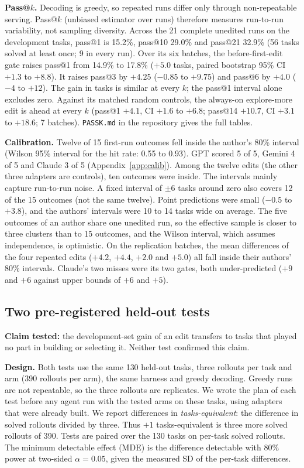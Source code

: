 \textbf{Pass@$k$.} Decoding is greedy, so repeated runs differ only through non-repeatable serving. Pass@$k$ (unbiased estimator over runs) therefore measures run-to-run variability, not sampling diversity. Across the 21 complete unedited runs on the development tasks, pass@1 is 15.2\%, pass@10 29.0\% and pass@21 32.9\% (56 tasks solved at least once; 9 in every run). Over its six batches, the before-first-edit gate raises pass@1 from 14.9\% to 17.8\% ($+5.0$ tasks, paired bootstrap 95\% CI $+1.3$ to $+8.8$). It raises pass@3 by $+4.25$ ($-0.85$ to $+9.75$) and pass@6 by $+4.0$ ($-4$ to $+12$). The gain in tasks is similar at every $k$; the pass@1 interval alone excludes zero. Against its matched random controls, the always-on explore-more edit is ahead at every $k$ (pass@1 $+4.1$, CI $+1.6$ to $+6.8$; pass@14 $+10.7$, CI $+3.1$ to $+18.6$; 7 batches). \texttt{PASSK.md} in the repository gives the full tables.

\textbf{Calibration.} Twelve of 15 first-run outcomes fell inside the author's 80\% interval (Wilson 95\% interval for the hit rate: 0.55 to 0.93). GPT scored 5 of 5, Gemini 4 of 5 and Claude 3 of 5 (Appendix~\ref{app:calib}). Among the twelve edits (the other three adapters are controls), ten outcomes were inside. The intervals mainly capture run-to-run noise. A fixed interval of $\pm 6$ tasks around zero also covers 12 of the 15 outcomes (not the same twelve). Point predictions were small ($-0.5$ to $+3.8$), and the authors' intervals were 10 to 14 tasks wide on average. The five outcomes of an author share one unedited run, so the effective sample is closer to three clusters than to 15 outcomes, and the Wilson interval, which assumes independence, is optimistic. On the replication batches, the mean differences of the four repeated edits ($+4.2$, $+4.4$, $+2.0$ and $+5.0$) all fall inside their authors' 80\% intervals. Claude's two misses were its two gates, both under-predicted ($+9$ and $+6$ against upper bounds of $+6$ and $+5$).

\subsection{Two pre-registered held-out tests}
\label{sec:heldout}
\textbf{Claim tested:} the development-set gain of an edit transfers to tasks that played no part in building or selecting it. Neither test confirmed this claim.

\textbf{Design.} Both tests use the same 130 held-out tasks, three rollouts per task and arm (390 rollouts per arm), the same harness and greedy decoding. Greedy runs are not repeatable, so the three rollouts are replicates. We wrote the plan of each test before any agent run with the tested arms on these tasks, using adapters that were already built. We report differences in \emph{tasks-equivalent}: the difference in solved rollouts divided by three. Thus $+1$ tasks-equivalent is three more solved rollouts of 390. Tests are paired over the 130 tasks on per-task solved rollouts. The minimum detectable effect (MDE) is the difference detectable with 80\% power at two-sided $\alpha = 0.05$, given the measured SD of the per-task differences.

